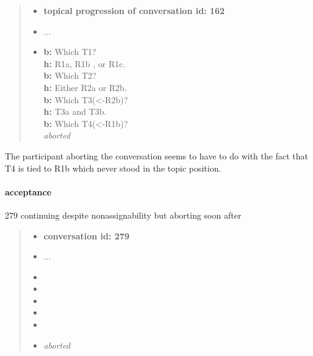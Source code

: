     \newcommand{\topicannot}[3]{
        \textbf{#1} #2 \\
    }

    \begin{quote}
    \begin{itemize}[label={}, leftmargin=0pt, itemsep=0.5em]
    \item \textbf{topical progression of conversation id: 162}
    \item ...
    \item \topicannot{b:}{Which T1?}
    \item \topicannot{h:}{R1a, R1b , or R1c.}
    \item \topicannot{b:}{Which T2?}
    \item \topicannot{h:}{Either R2a or R2b.}
    \item \topicannot{b:}{Which T3(<-R2b)?}
    \item \topicannot{h:}{T3a and T3b.}
    \item \topicannot{b:}{Which T4(<-R1b)?}
    \item \textit{aborted}
    \end{itemize}
    \end{quote}

    The participant aborting the conversation
    seems to have to do with the fact that
    T4 is tied to R1b which never stood in the topic position.

\paragraph{acceptance}

279 continuing despite nonassignability but aborting soon after

    \begin{quote}
    \begin{itemize}[label={}, leftmargin=0pt, itemsep=0.5em]
    \item \textbf{conversation id: 279}
    \item ...
    \item {}
    \item {}
    \item {}
    \item {}
    \item {}
    \item \textit{aborted}
    \end{itemize}
    \end{quote}

